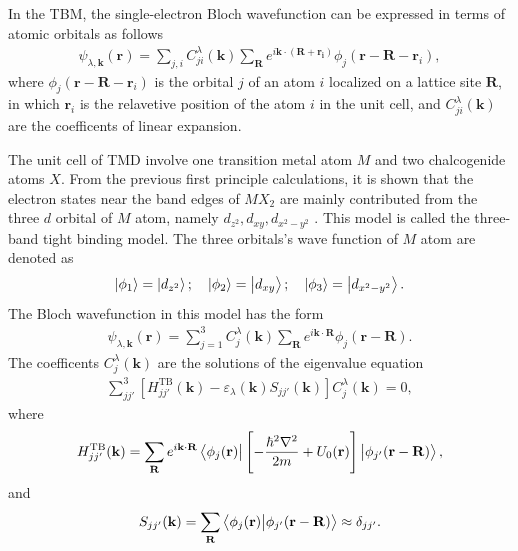 \documentclass{report}
\newcommand{\f}[2]{\dfrac{#1}{#2}}
\begin{document}
In the \acf{TBM}, the single-electron Bloch wavefunction can be expressed in terms of atomic orbitals as follows
\begin{gather}
	\psi_{\lambda,\mathbf{k}}(\mathbf{r}) = \sum_{j,i} C_{ji}^{\lambda}(\mathbf{k}) \sum_{\mathbf{R}} e^{i\mathbf{k}\cdot(\mathbf{R+\mathbf{r}_{i}})} \phi_{j}(\mathbf{r} - \mathbf{R} - \mathbf{r}_{i}),
\end{gather}
where $\phi_{j}(\mathbf{r} - \mathbf{R} - \mathbf{r}_{i})$ is the orbital $j$ of an atom $i$ localized on a lattice site $\mathbf{R}$, in which $\mathbf{r}_{i}$ is the relavetive position of the atom $i$ in the unit cell, and $C_{ji}^{\lambda}(\mathbf{k})$ are the coefficents of linear expansion.

The unit cell of \ac{TMD} involve one transition metal atom $M$ and two chalcogenide atoms $X$. From the previous first principle calculations, it is shown that the electron states near the band edges of $MX_{2}$ are mainly contributed from the three $d$ orbital of $M$ atom, namely $d_{z^{2}},d_{xy},d_{x^{2}-y^{2}}$ \cite{PhysRevB.88.085433}. This model is called the three-band tight binding model. The three orbitals's wave function of $M$ atom are denoted as
\begin{gather}
	\ket{\phi_{1}} = \ket{d_{z^{2}}} ; \quad \ket{\phi_{2}} = \ket{d_{xy}} ; \quad \ket{\phi_{3}} = \ket{d_{x^{2} - y^{2}}}.
\end{gather}
The Bloch wavefunction in this model has the form
\begin{gather}
	\psi_{\lambda,\mathbf{k}}(\mathbf{r}) = \sum_{j=1}^{3} C_{j}^{\lambda}(\mathbf{k}) \sum_{\mathbf{R}} e^{i \mathbf{k \cdot R}} \phi_{j}(\mathbf{r} - \mathbf{R}).
\end{gather}
The coefficents $C_{j}^{\lambda}(\mathbf{k})$ are the solutions of the eigenvalue equation
\begin{gather}
	\sum_{jj'}^{3} \left[H_{jj'}^{\text{TB}}(\mathbf{k}) - \varepsilon_{\lambda}(\mathbf{k}) S_{jj'}(\mathbf{k})\right] C_{j}^{\lambda}(\mathbf{k}) = 0,
\end{gather}
where
\begin{gather}
	H_{jj'}^{\text{TB}}(\mathbf{k}) = \sum_{\mathbf{R}} e^{i \mathbf{k \cdot R}} \bra{\phi_{j}(\mathbf{r})} \left[-\f{\hbar^{2} \nabla^{2}}{2m} + U_{0}(\mathbf{r})\right] \ket{\phi_{j'}(\mathbf{r - R})},
\end{gather}
and
\begin{gather}
	S_{jj'}(\mathbf{k}) = \sum_{\mathbf{R}} \bra{\phi_{j}(\mathbf{r})} \ket{\phi_{j'}(\mathbf{r - R})} \approx \delta_{jj'}.
\end{gather}
\end{document}
